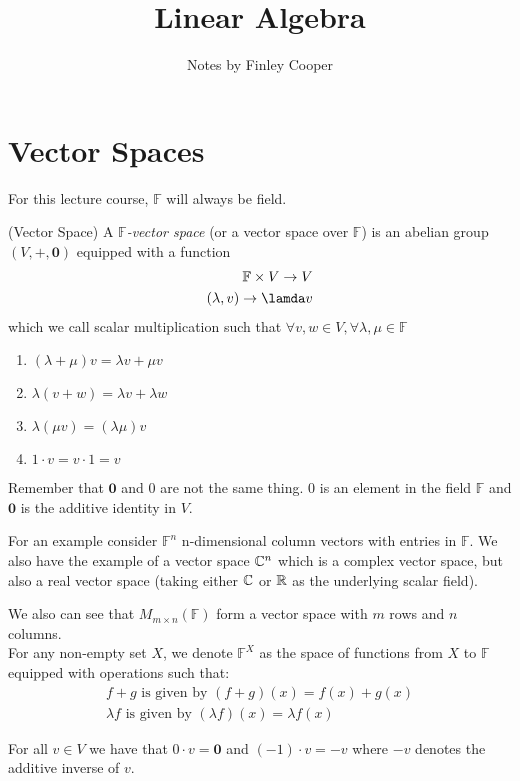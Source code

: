 \documentclass{article}
\title{Linear Algebra}
\author{Notes by Finley Cooper}
\newcommand{\F}{\mathbb{F}}
\begin{document}
  \maketitle
  \newpage
  \tableofcontents
  \newpage
  \section{Vector Spaces}
  For this lecture course, $ \F $ will always be field.
  \begin{definition}
	  (Vector Space) A $ \F $\textit{-vector space} (or a vector space over $ \F $) is an abelian group $ (V,+,\boldsymbol 0) $ equipped with a function
	  \begin{align*}
	    \F\times V\to V \\
	    (\lambda, v)\to \lamda v
	  \end{align*}
	  which we call scalar multiplication such that $ \forall v,w\in V, \forall \lambda,\mu\in\F $
	  \begin{enumerate} 
		  \item $ (\lambda + \mu)v=\lambda v + \mu v $
		  \item $ \lambda(v + w)=\lambda v + \lambda w $
		  \item $ \lambda(\mu v)=(\lambda \mu)v $
		  \item $ 1\cdot v = v\cdot 1 = v $
	  \end{enumerate}
  \end{definition}
  Remember that $ \boldsymbol 0 $ and $ 0 $ are not the same thing. $ 0 $ is an element in the field $ \F $ and $ \boldsymbol 0 $ is the additive identity in $ V $.\par
  For an example consider $ \F^n $ n-dimensional column vectors with entries in $ \F $. We also have the example of a vector space $ \mathbb{C}^n $ which is a complex vector space, but also a real vector space (taking either $ \mathbb{C} $ or $ \mathbb{R} $ as the underlying scalar field).\par
  We also can see that $ M_{m\times n}(\F) $ form a vector space with $ m $ rows and $ n $ columns.\\
  For any non-empty set $ X $, we denote $ \F^X $ as the space of functions from $ X $ to $ \F $ equipped with operations such that:
\begin{align*}
	f+g \text{ is given by } (f+g)(x)=f(x)+g(x)\\
	\lambda f \text{ is given by } (\lambda f)(x)=\lambda f(x)
\end{align*}
\begin{proposition}
  For all $ v\in V $ we have that $ 0\cdot v = \boldsymbol 0 $ and $ (-1)\cdot v=-v $ where $ -v $ denotes the additive inverse of $ v $.
\end{proposition}
\end{document}
